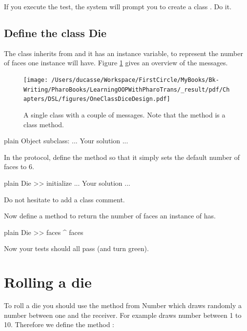 \documentclass[10pt,twoside,english]{_support/latex/sbabook/sbabook}
\begin{document}
If you execute the test, the system will prompt you to create a class . Do it.
\subsection{Define the class Die}
The class  inherits from  and it has an instance variable,  to represent the number of faces one instance will have. Figure \ref{figOneClassDiceDesign} gives an overview of the messages. 


\begin{figure}

\begin{center}
\texttt{[image: /Users/ducasse/Workspace/FirstCircle/MyBooks/Bk-Writing/PharoBooks/LearningOOPWithPharoTrans/\_result/pdf/Chapters/DSL/figures/OneClassDiceDesign.pdf]}\caption{A single class with a couple of messages. Note that the method  is  a class method.\label{figOneClassDiceDesign}}\end{center}
\end{figure}


\begin{displaycode}{plain}
Object subclass:
	... Your solution ...
\end{displaycode}

In the  protocol, define the method  so that it simply sets the default number of faces to 6. 

\begin{displaycode}{plain}
Die >> initialize
	... Your solution ...
\end{displaycode}

Do not hesitate to add a class comment. 

Now define a method to return the number of faces an instance of  has.

\begin{displaycode}{plain}
Die >> faces
	^ faces
\end{displaycode}

Now your tests should all pass (and turn green).
\section{Rolling a die}
To roll a die you should use the method from Number  which draws randomly a 
number between one and the receiver. For example  draws number between 1 to 10. 
Therefore we define the method :
\end{document}
